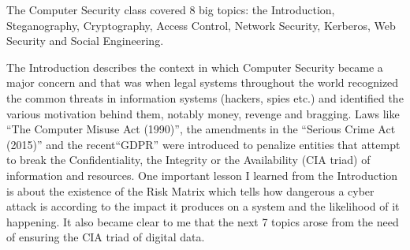 \documentclass[a4paper]{article}
\begin{document}
The Computer Security class covered 8 big topics:
the Introduction,
Steganography,
Cryptography,
Access Control,
Network Security,
Kerberos,
Web Security and
Social Engineering.

The Introduction describes the context in which Computer Security became
a major concern and that was when legal systems throughout the world
recognized the common threats in information systems (hackers, spies etc.)
and identified the various motivation behind them, notably money, revenge
and bragging. Laws like ``The Computer Misuse Act (1990)'', the amendments
in the ``Serious Crime Act (2015)'' and the recent``GDPR'' were introduced
to penalize entities that attempt to break the
Confidentiality, the Integrity or the Availability (CIA triad) of information
and resources. One important lesson I learned from the Introduction is
about the existence of the Risk Matrix which tells how dangerous
a cyber attack is
according to the impact it produces on a system and the likelihood of
it happening. It also became clear to me that the next 7 topics arose
from the need of ensuring
the CIA triad of digital data.
\end{document}
